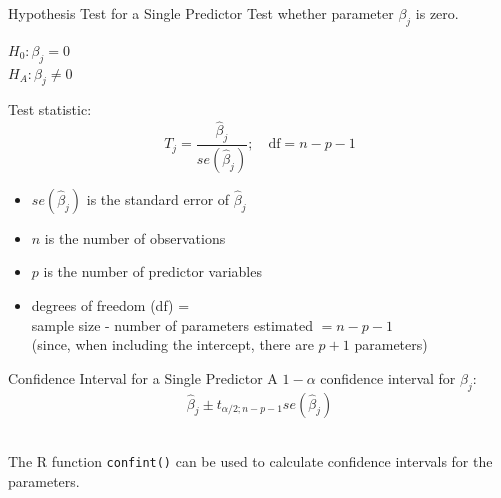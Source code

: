 \documentclass[10pt]{beamer}
\begin{document}
\begin{frame}{Hypothesis Test for a Single Predictor}
Test whether parameter $\beta_j$ is zero.\\
\vspace{10pt}

$H_0: \beta_j = 0$\\
$H_A: \beta_j \neq 0$\\
\vspace{10pt}

Test statistic:
$$ T_j = \frac{\hat{\beta}_j}{se(\hat{\beta}_j)}; \quad \text{df} = n-p-1 $$
\begin{itemize}
\item $se(\hat{\beta}_j)$ is the standard error of $\hat{\beta}_j$
\item $n$ is the number of observations
\item $p$ is the number of predictor variables
\item degrees of freedom (df) =\\ 
sample size - number of parameters estimated $= n - p-1$\\ 
(since, when including the intercept, there are $p+1$ parameters)
\end{itemize}
\end{frame}



\begin{frame}{Confidence Interval for a Single Predictor}
A $1-\alpha$ confidence interval for $\beta_j$:
$$ \hat{\beta}_j \pm t_{\alpha/2; n-p-1} se(\hat{\beta}_j) $$\\
\vspace{10pt}

The R function \texttt{confint()} can be used to calculate confidence intervals for the parameters.
\end{frame}
\end{document}
